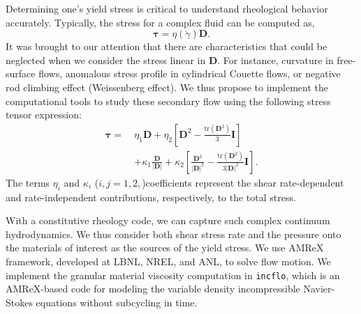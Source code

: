 Determining one's yield stress is critical to understand rheological behavior accurately. Typically, the stress for a complex fluid can be computed as,
\begin{equation}
   \boldsymbol{\tau} = \eta(\dot{\gamma}) \boldsymbol{D}.
\end{equation}
It was brought to our attention that there are characteristics that could be neglected when we consider the stress linear in $\boldsymbol{D}$. For instance, curvature in free-surface flows, anomalous stress profile in cylindrical Couette flows, or negative rod climbing effect (Weissenberg effect). We thus propose to implement the computational tools to study these secondary flow using the following stress tensor expression:
\begin{align}
  {\bm  \tau}
  =  \ &\eta_1 {\bm D} 
  + \eta_2  \left[ {\bm D}^2  - \frac{\text{tr}\left({\bm D}^2\right)}{3}{\bm I} \right]
  \nonumber \\
  & + \kappa_1 \frac{{\bm D}}{|{\bm D}|} 
  + \kappa_2  \left[ \frac{{\bm D}^2}{|{\bm D}|^2}  
  - \frac{\text{tr}\left({\bm D}^2\right)}{3|{\bm D}|^2}{\bm I} \right].
\end{align}
The terms $\eta_i$ and $\kappa_i$ ($i, j = 1,2,$)coefficients represent the shear rate-dependent and rate-independent contributions, respectively, to the total stress.
\par
With a constitutive rheology code, we can capture such complex continuum hydrodynamics. We thus consider both shear stress rate and the pressure onto the materials of interest as the sources of the yield stress. 
We use AMReX framework, developed at LBNL, NREL, and ANL, to solve flow motion. We implement the granular material viscosity computation in \verb+incflo+, which is an AMReX-based code for modeling the variable density incompressible Navier-Stokes equations without subcycling in time.




